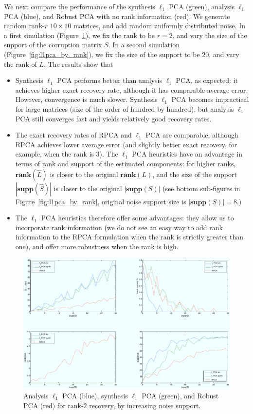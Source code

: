 We next compare the performance of the synthesis $\ell_1$ PCA (green), analysis $\ell_1$ PCA (blue), and Robust PCA with no rank information (red). We generate random rank-$r$ $10\times 10$ matrices, and add random uniformly distributed noise. In a first simulation (Figure~\ref{fig:l1pca_by_support}), we fix the rank to be $r = 2$, and vary the size of the support of the corruption matrix $S$. In a second simulation (Figure~\ref{fig:l1pca_by_rank}), we fix the size of the support to be $20$, and vary the rank of $L$. The results show that
\begin{itemize}
\item Synthesis $\ell_1$ PCA performs better than analysis $\ell_1$ PCA, as expected: it achieves higher exact recovery rate, although it has comparable average error. However, convergence is much slower. Synthesis $\ell_1$ PCA becomes impractical for large matrices (size of the order of hundred by hundred), but analysis $\ell_1$ PCA still converges fast and yields relatively good recovery rates.
\item The exact recovery rates of RPCA and  $\ell_1$ PCA are comparable, although RPCA achieves lower average error (and slightly better exact recovery, for example, when the rank is $3$). The $\ell_1$ PCA heuristics have an advantage in terms of rank and support of the estimated components: for higher ranks, $\mathbf{rank}(\hat{L})$ is closer to the original $\mathbf{rank}(L)$, and the size of the support $|\mathbf{supp}(\hat{S})|$ is closer to the original $|\mathbf{supp}(S)|$ (see bottom sub-figures in Figure~\ref{fig:l1pca_by_rank}, original noise support size is $|\mathbf{supp}(S)| = 8$.)
\item The $\ell_1$ PCA heuristics therefore offer some advantages: they allow us to incorporate rank information (we do not see an easy way to add rank information to the RPCA formulation when the rank is strictly greater than one), and offer more robustness when the rank is high.
\end{itemize}
%
\begin{figure}[h!]
\centering
\includegraphics[width=\textwidth]{../figures/l1pca_10x10_rank2_by_support.pdf}
\caption{Analysis $\ell_1$ PCA (blue), synthesis $\ell_1$ PCA (green), and Robust PCA (red) for rank-$2$ recovery, by increasing noise support.}
\label{fig:l1pca_by_support}
\end{figure}

